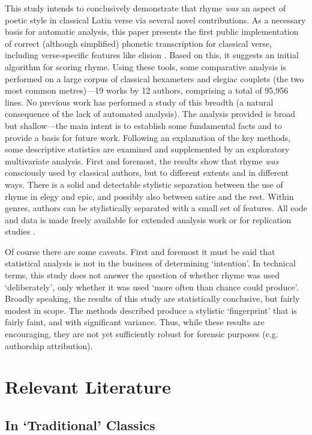 \documentclass[twocolumn, switch]{article} %
\begin{document}
This study intends to conclusively demonstrate that rhyme \emph{was} an aspect
of poetic style in classical Latin verse via several novel contributions. As a
necessary basis for automatic analysis, this paper presents the first public
implementation of correct (although simplified) phonetic transcription for
classical verse, including verse-specific features like elision
\cite{nagy_mqdq_2019}. Based on this, it suggests an initial algorithm for
scoring rhyme. Using these tools, some comparative analysis is performed on a
large corpus of classical hexameters and elegiac couplets (the two most common
metres)---19 works by 12 authors, comprising a total of 95,956 lines. No
previous work has performed a study of this breadth (a natural consequence of
the lack of automated analysis). The analysis provided is broad but
shallow---the main intent is to establish some fundamental facts and to
provide a basis for future work. Following an explanation of the key methods,
some descriptive statistics are examined and supplemented by an exploratory
multivariate analysis. First and foremost, the results show that rhyme
\emph{was} consciously used by classical authors, but to different extents and
in different ways. There is a solid and detectable stylistic separation
between the use of rhyme in elegy and epic, and possibly also between satire
and the rest. Within genres, authors can be stylistically separated with a
small set of features. All code and data is made freely available for extended
analysis work or for replication studies \cite{nagy_rhyme_2021}.

Of course there are some caveats. First and foremost it must be said that
statistical analysis is not in the business of determining `intention'. In
technical terms, this study does not answer the question of whether rhyme was
used `deliberately', only whether it was used `more often than chance could
produce'. Broadly speaking, the results of this study are statistically
conclusive, but fairly modest in scope. The methods described produce a
stylistic `fingerprint' that is fairly faint, and with significant variance.
Thus, while these results are encouraging, they are not yet sufficiently
robust for forensic purposes (e.g. authorship attribution).

\section{Relevant Literature}
\label{sec:lit}

\subsection{In `Traditional' Classics}
\end{document}
